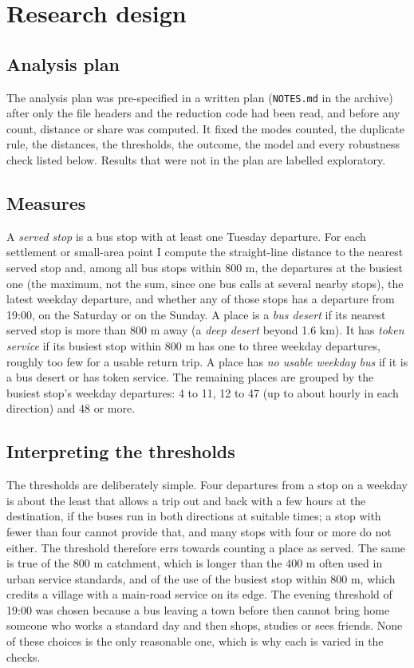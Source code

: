 \documentclass[11pt,a4paper]{article}
\begin{document}
\section{Research design}\label{sec:design}
\subsection{Analysis plan}
The analysis plan was pre-specified in a written plan (\texttt{NOTES.md} in the archive) after only the file headers and the reduction code had been read, and before any count, distance or share was computed. It fixed the modes counted, the duplicate rule, the distances, the thresholds, the outcome, the model and every robustness check listed below. Results that were not in the plan are labelled exploratory.

\subsection{Measures}
A \textit{served stop} is a bus stop with at least one Tuesday departure. For each settlement or small-area point I compute the straight-line distance to the nearest served stop and, among all bus stops within 800 m, the departures at the busiest one (the maximum, not the sum, since one bus calls at several nearby stops), the latest weekday departure, and whether any of those stops has a departure from 19:00, on the Saturday or on the Sunday. A place is a \textit{bus desert} if its nearest served stop is more than 800 m away (a \textit{deep desert} beyond 1.6 km). It has \textit{token service} if its busiest stop within 800 m has one to three weekday departures, roughly too few for a usable return trip. A place has \textit{no usable weekday bus} if it is a bus desert or has token service. The remaining places are grouped by the busiest stop's weekday departures: 4 to 11, 12 to 47 (up to about hourly in each direction) and 48 or more.

\subsection{Interpreting the thresholds}
The thresholds are deliberately simple. Four departures from a stop on a weekday is about the least that allows a trip out and back with a few hours at the destination, if the buses run in both directions at suitable times; a stop with fewer than four cannot provide that, and many stops with four or more do not either. The threshold therefore errs towards counting a place as served. The same is true of the 800 m catchment, which is longer than the 400 m often used in urban service standards, and of the use of the busiest stop within 800 m, which credits a village with a main-road service on its edge. The evening threshold of 19:00 was chosen because a bus leaving a town before then cannot bring home someone who works a standard day and then shops, studies or sees friends. None of these choices is the only reasonable one, which is why each is varied in the checks.
\end{document}
